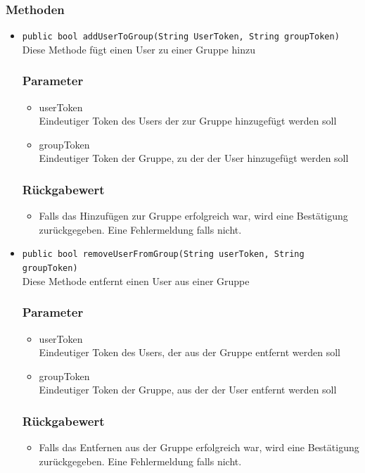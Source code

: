 \documentclass[a4paper]{scrreprt}
\begin{document}
\subsubsection*{Methoden}
\begin{addmargin}[25pt]{0pt}
\begin{itemize}

\item \texttt{public bool addUserToGroup(String UserToken, String groupToken)}\\
	Diese Methode fügt einen User zu einer Gruppe hinzu
	\subsubsection*{Parameter}
	\begin{itemize}
	\item userToken \\
		Eindeutiger Token des Users der zur Gruppe hinzugefügt werden soll
	\item groupToken \\
		Eindeutiger Token der Gruppe, zu der der User hinzugefügt werden soll
	\end{itemize}
	\subsubsection*{Rückgabewert}
	\begin{itemize}
	\item Falls das Hinzufügen zur Gruppe erfolgreich war, wird eine Bestätigung zurückgegeben. Eine Fehlermeldung falls nicht.
	\end{itemize}
	
\item \texttt{public bool removeUserFromGroup(String userToken, String groupToken)}\\
	Diese Methode entfernt einen User aus einer Gruppe
	\subsubsection*{Parameter}
	\begin{itemize}
	\item userToken \\
		Eindeutiger Token des Users, der aus der Gruppe entfernt werden soll
	\item groupToken \\
		Eindeutiger Token der Gruppe, aus der der User entfernt werden soll
	\end{itemize}
	\subsubsection*{Rückgabewert}
	\begin{itemize}
	\item Falls das Entfernen aus der Gruppe erfolgreich war, wird eine Bestätigung zurückgegeben. Eine Fehlermeldung falls nicht.
	\end{itemize}
\end{itemize}
\end{addmargin}
\end{document}
